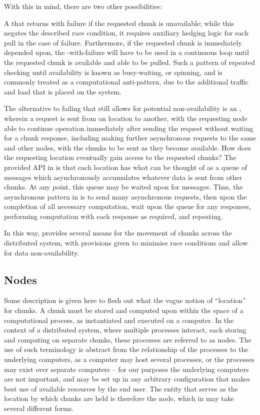 With this in mind, there are two other possibilities:

A  that returns with failure if the requested chunk is unavailable; while this negates the described race condition, it requires auxiliary hedging logic for each pull in the case of failure.
Furthermore, if the requested chunk is immediately depended upon, the -with-failure will have to be used in a continuous loop until the requested chunk is available and able to be pulled.
Such a pattern of repeated checking until availability is known as busy-waiting, or spinning, and is commonly treated as a computational anti-pattern, due to the additional traffic and load that is placed on the system\cite{corbet2023}.

The alternative to failing  that still allows for potential non-availability is an , wherein a request is sent from on location to another, with the requesting node able to continue operation immediately after sending the request without waiting for a chunk response, including making further asynchronous requests to the same and other nodes, with the chunks to be sent as they become available.
How does the requesting location eventually gain access to the requested chunks?
The provided API in \lsr{} is that each location has what can be thought of as a queue of messages which asynchronously accumulates whatever data is sent from other chunks.
At any point, this queue may be waited upon for messages.
Thus, the asynchronous pattern in \lsr{} is to send many asynchronous requests, then upon the completion of all necessary computation, wait upon the queue for any responses, performing computation with each response as required, and repeating.

In this way, \lsr{} provides several means for the movement of chunks across the distributed system, with provisions given to minimise race conditions and allow for data non-availability.

\subsection{Nodes}\label{sec:node}

Some description is given here to flesh out what the vague notion of ``location'' for chunks.
A chunk must be stored and computed upon within the space of a computational process, as instantiated and executed on a computer.
In the context of a distributed system, where multiple processes interact, each storing and computing on separate chunks, these processes are referred to as nodes.
The use of such terminology is abstract from the relationship of the processes to the underlying computers, as a computer may host several processes, or the processes may exist over separate computers -- for our purposes the underlying computers are not important, and may be set up in any arbitrary configuration  that makes best use of available resources by the end user.
The entity that serves as the location by which chunks are held is therefore the node, which in \lsr{} may take several different forms.

